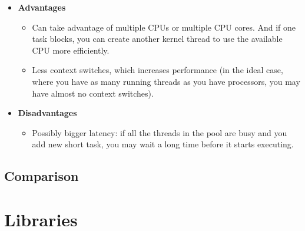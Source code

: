 \documentclass{article}
\begin{document}
\begin{flushleft}
\begin{itemize}
	\begin{itemize}
		\item \textbf{Advantages}
		\begin{itemize}
			\item Can take advantage of multiple CPUs or multiple CPU cores. And if one task blocks, you can create another kernel thread to use the available CPU more efficiently.
			\item Less context switches, which increases performance (in the ideal case, where you have as many running threads as you have processors, you may have almost no context switches).
		\end{itemize}
	\end{itemize}
	\begin{itemize}
		\item \textbf{Disadvantages}
		\begin{itemize}
			\item Possibly bigger latency: if all the threads in the pool are busy and you add new short task, you may wait a long time before it starts executing.
		\end{itemize}	
	\end{itemize}
\end{itemize}
\end{flushleft}

\subsection{Comparison}
\begin{center}
\end{center}

\section{Libraries}
\end{document}
